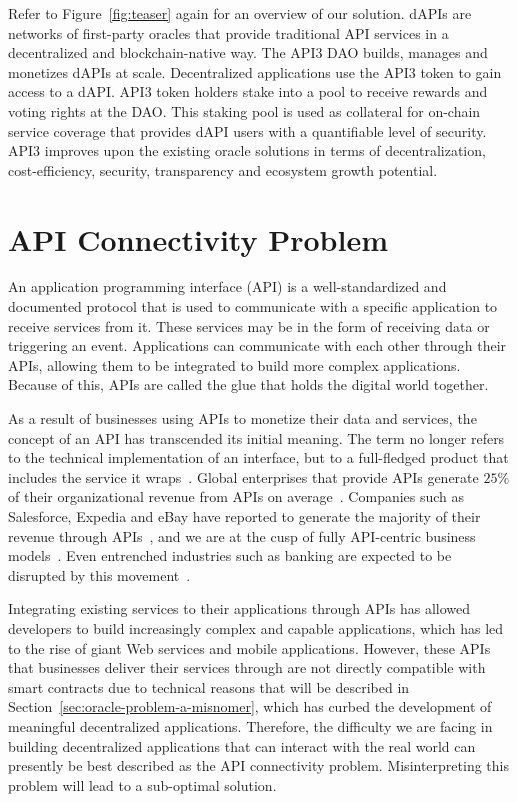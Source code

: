 \documentclass[11pt]{article}
\begin{document}
Refer to Figure~\ref{fig:teaser} again for an overview of our solution.
dAPIs are networks of first-party oracles that provide traditional API services in a decentralized and blockchain-native way.
The API3 DAO builds, manages and monetizes dAPIs at scale.
Decentralized applications use the API3 token to gain access to a dAPI.
API3 token holders stake into a pool to receive rewards and voting rights at the DAO.
This staking pool is used as collateral for on-chain service coverage that provides dAPI users with a quantifiable level of security.
API3 improves upon the existing oracle solutions in terms of decentralization, cost-efficiency, security, transparency and ecosystem growth potential.

\section{API Connectivity Problem}
\label{sec:api-connectivity-problem}

An application programming interface (API) is a well-standardized and documented protocol that is used to communicate with a specific application to receive services from it.
These services may be in the form of receiving data or triggering an event.
Applications can communicate with each other through their APIs, allowing them to be integrated to build more complex applications.
Because of this, APIs are called the glue that holds the digital world together.

As a result of businesses using APIs to monetize their data and services, the concept of an API has transcended its initial meaning.
The term no longer refers to the technical implementation of an interface, but to a full-fledged product that includes the service it wraps~\cite{deloitte:2015}.
Global enterprises that provide APIs generate $25\%$ of their organizational revenue from APIs on average~\cite{mulesoft:2019}.
Companies such as Salesforce, Expedia and eBay have reported to generate the majority of their revenue through APIs~\cite{iyer:2015}, and we are at the cusp of fully API-centric business models~\cite{ibm:2016}.
Even entrenched industries such as banking are expected to be disrupted by this movement~\cite{capgemini:2019a}.

Integrating existing services to their applications through APIs has allowed developers to build increasingly complex and capable applications, which has led to the rise of giant Web services and mobile applications.
However, these APIs that businesses deliver their services through are not directly compatible with smart contracts due to technical reasons that will be described in Section~\ref{sec:oracle-problem-a-misnomer}, which has curbed the development of meaningful decentralized applications.
Therefore, the difficulty we are facing in building decentralized applications that can interact with the real world can presently be best described as the API connectivity problem.
Misinterpreting this problem will lead to a sub-optimal solution.
\end{document}
